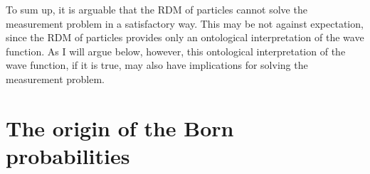 To sum up, it is arguable that the RDM of particles cannot solve the measurement problem in a satisfactory way. 
This may be not against expectation, since the RDM of particles provides only an ontological interpretation of the wave function.
As I will argue below, however, this ontological interpretation of the wave function, if it is true, may also have implications for solving the measurement problem.




\section{The origin of the Born probabilities}%

